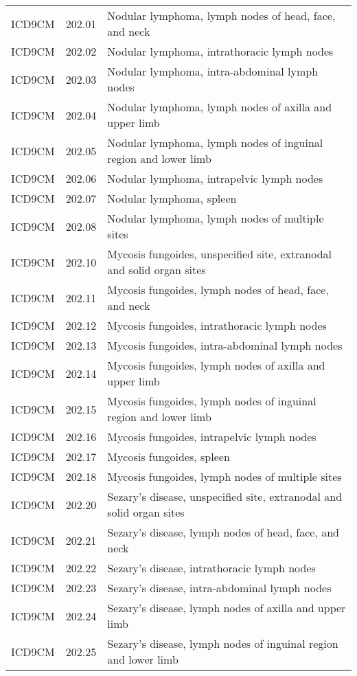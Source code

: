 \begin{longtable}{p{}p{}p{}}
  ICD9CM & 202.01 & Nodular lymphoma, lymph nodes of head, face, and neck \\ 
  ICD9CM & 202.02 & Nodular lymphoma, intrathoracic lymph nodes \\ 
  ICD9CM & 202.03 & Nodular lymphoma, intra-abdominal lymph nodes \\ 
  ICD9CM & 202.04 & Nodular lymphoma, lymph nodes of axilla and upper limb \\ 
  ICD9CM & 202.05 & Nodular lymphoma, lymph nodes of inguinal region and lower limb \\ 
  ICD9CM & 202.06 & Nodular lymphoma, intrapelvic lymph nodes \\ 
  ICD9CM & 202.07 & Nodular lymphoma, spleen \\ 
  ICD9CM & 202.08 & Nodular lymphoma, lymph nodes of multiple sites \\ 
  ICD9CM & 202.10 & Mycosis fungoides, unspecified site, extranodal and solid organ sites \\ 
  ICD9CM & 202.11 & Mycosis fungoides, lymph nodes of head, face, and neck \\ 
  ICD9CM & 202.12 & Mycosis fungoides, intrathoracic lymph nodes \\ 
  ICD9CM & 202.13 & Mycosis fungoides, intra-abdominal lymph nodes \\ 
  ICD9CM & 202.14 & Mycosis fungoides, lymph nodes of axilla and upper limb \\ 
  ICD9CM & 202.15 & Mycosis fungoides, lymph nodes of inguinal region and lower limb \\ 
  ICD9CM & 202.16 & Mycosis fungoides, intrapelvic lymph nodes \\ 
  ICD9CM & 202.17 & Mycosis fungoides, spleen \\ 
  ICD9CM & 202.18 & Mycosis fungoides, lymph nodes of multiple sites \\ 
  ICD9CM & 202.20 & Sezary's disease, unspecified site, extranodal and solid organ sites \\ 
  ICD9CM & 202.21 & Sezary's disease, lymph nodes of head, face, and neck \\ 
  ICD9CM & 202.22 & Sezary's disease, intrathoracic lymph nodes \\ 
  ICD9CM & 202.23 & Sezary's disease, intra-abdominal lymph nodes \\ 
  ICD9CM & 202.24 & Sezary's disease, lymph nodes of axilla and upper limb \\ 
  ICD9CM & 202.25 & Sezary's disease, lymph nodes of inguinal region and lower limb \\ 

\end{longtable}
